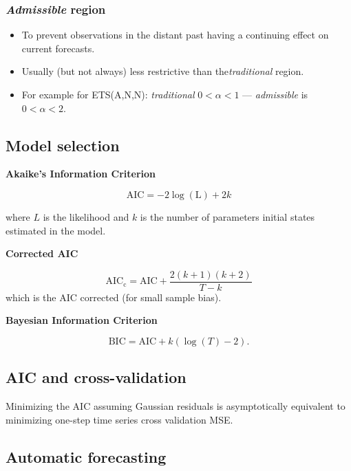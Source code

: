 \documentclass[]{book}
\providecommand{\tightlist}{%
  \setlength{\itemsep}{0pt}\setlength{\parskip}{0pt}}
\begin{document}
\hypertarget{admissible-region}{%
\subsubsection{\texorpdfstring{\emph{Admissible} region}{Admissible region}}\label{admissible-region}}

\begin{itemize}
\tightlist
\item
  To prevent observations in the distant past having a continuing effect on current forecasts.
\item
  Usually (but not always) less restrictive than the\emph{traditional} region.
\item
  For example for ETS(A,N,N): \newline \textit{traditional} \(0< \alpha <1\) --- \textit{admissible} is \(0< \alpha <2\).
\end{itemize}

\hypertarget{model-selection}{%
\subsection{Model selection}\label{model-selection}}

\textbf{Akaike's Information Criterion}

\[\text{AIC} = -2\log(\text{L}) + 2k\]

where \(L\) is the likelihood and \(k\) is the number of parameters initial states estimated in the model.

\textbf{Corrected AIC}

\[\text{AIC}_{\text{c}} = \text{AIC} + \frac{2(k+1)(k+2)}{T-k}\]
which is the AIC corrected (for small sample bias).

\textbf{Bayesian Information Criterion}

\[\text{BIC} = \text{AIC} + k(\log(T)-2).\]

\hypertarget{aic-and-cross-validation}{%
\subsection{AIC and cross-validation}\label{aic-and-cross-validation}}

Minimizing the AIC assuming Gaussian residuals is asymptotically equivalent to minimizing one-step time series cross validation MSE.

\hypertarget{automatic-forecasting}{%
\subsection{Automatic forecasting}\label{automatic-forecasting}}
\end{document}
